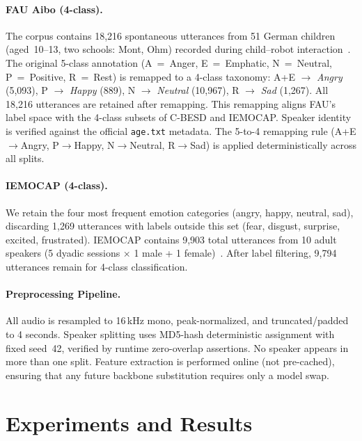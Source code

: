 \documentclass[11pt,a4paper]{article}
\begin{document}
\paragraph{FAU Aibo (4-class).} The corpus contains 18,216 spontaneous
utterances from 51 German children (aged~10--13, two schools: Mont, Ohm)
recorded during child--robot interaction~\cite{batliner2011fau,
schuller2009interspeech,steidl2009fau}. The original 5-class annotation (A~=~Anger,
E~=~Emphatic, N~=~Neutral, P~=~Positive, R~=~Rest) is remapped to a 4-class
taxonomy: A+E $\rightarrow$ \textit{Angry} (5,093), P $\rightarrow$
\textit{Happy} (889), N $\rightarrow$ \textit{Neutral} (10,967), R
$\rightarrow$ \textit{Sad} (1,267). All 18,216 utterances are retained after
remapping. This remapping aligns FAU's label space with the 4-class subsets of
C-BESD and IEMOCAP. Speaker identity is verified against the official
\texttt{age.txt} metadata. The 5-to-4 remapping rule (A+E$\rightarrow$Angry,
P$\rightarrow$Happy, N$\rightarrow$Neutral, R$\rightarrow$Sad) is applied
deterministically across all splits.

\paragraph{IEMOCAP (4-class).} We retain the four most frequent emotion
categories (angry, happy, neutral, sad), discarding 1,269 utterances with
labels outside this set (fear, disgust, surprise, excited, frustrated).
IEMOCAP contains 9,903 total utterances from 10 adult speakers (5 dyadic
sessions $\times$ 1 male + 1 female)~\cite{busso2008iemocap}. After label
filtering, 9,794 utterances remain for 4-class classification.

\paragraph{Preprocessing Pipeline.} All audio is resampled to 16\,kHz mono,
peak-normalized, and truncated/padded to 4 seconds. Speaker splitting uses
MD5-hash deterministic assignment with fixed seed~42, verified by runtime
zero-overlap assertions. No speaker appears in more than one split. Feature
extraction is performed online (not pre-cached), ensuring that any future
backbone substitution requires only a model swap.


\section{Experiments and Results}
\label{sec:experiments_results}
\end{document}
